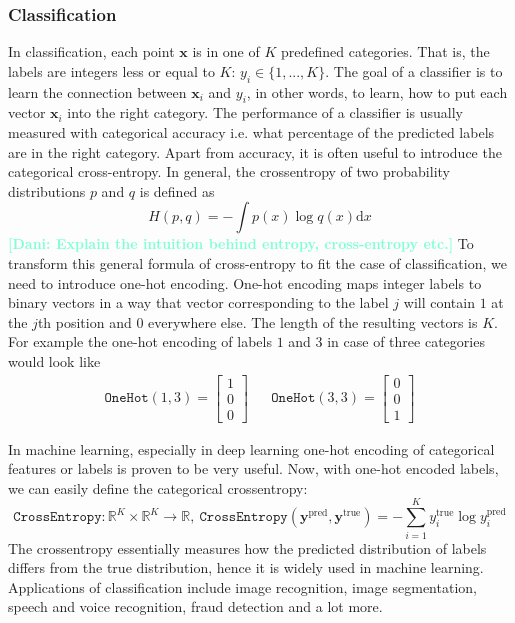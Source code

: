 \documentclass[12pt, a4paper,  nobibnotes]{article}
\newcommand{\dd}{\mathrm{d}}
\newcommand{\nd}[1]{\textcolor{Aquamarine}{\textbf{[Dani: #1]}}}
\begin{document}
\subsubsection{Classification}
In classification, each point $\mathbf x$ is in one of $K$ predefined categories. That is, 
the labels are integers less or equal to $K$: $y_i \in \{1, ..., K\}$. The goal of a classifier 
is to learn the connection between $\mathbf x_i$ and $y_i$, in other words, to learn, how to 
put each vector $\mathbf x_i$ into the right category. The performance of a classifier is usually measured
with categorical accuracy i.e. what percentage of the predicted labels are in the right category.
Apart from accuracy, it is often useful to introduce the categorical cross-entropy. In general, the 
crossentropy of two probability distributions $p$ and $q$ is defined as 
\begin{equation}
    H(p,q) = -\int p(x)\log q(x)\dd x
\end{equation}
\nd{Explain the intuition behind entropy, cross-entropy etc.}
To transform this general formula of cross-entropy to fit the case of classification, we need to introduce
one-hot encoding. One-hot encoding maps integer labels to binary vectors in a way that vector 
corresponding to the label $j$ will contain $1$ at the $j$th position and $0$ everywhere else. The
length of the resulting vectors is $K$. For example the one-hot encoding of labels $1$ and $3$ in case of 
three categories would look like
\begin{align}
    \texttt{OneHot}(1,3) = \begin{bmatrix}
        1\\0\\0
    \end{bmatrix}
    &&\texttt{OneHot}(3,3) = \begin{bmatrix}
        0\\0\\1
    \end{bmatrix}
\end{align}

In machine learning, especially in deep learning one-hot encoding of categorical features or labels
is proven to be very useful. Now, with one-hot encoded labels, we can easily define the categorical
crossentropy:
\begin{equation}
    \texttt{CrossEntropy}: \mathbb R^K\times \mathbb R^K \rightarrow \mathbb R,~
    \texttt{CrossEntropy}(\mathbf y^{\textrm{pred}}, \mathbf y^{\textrm{true}})
    = -\sum\limits_{i=1}^K y_i^{\textrm{true}} \log y_i^{\textrm{pred}}
    \label{eq:crossentropy}
\end{equation}
The crossentropy essentially measures how the predicted distribution of labels differs from the 
true distribution, hence it is widely used in machine learning.
Applications of classification include image recognition, image segmentation, speech and voice recognition,
fraud detection and a lot more. 
\end{document}
